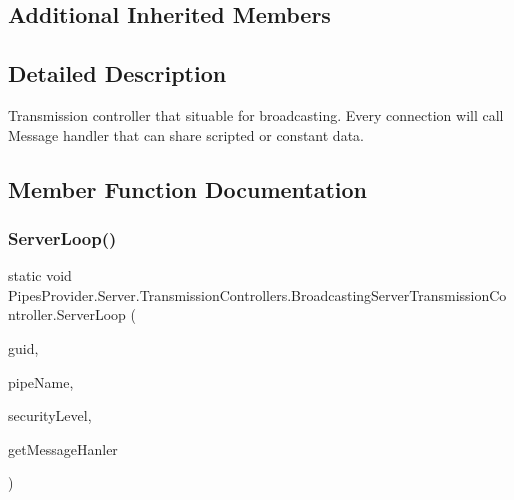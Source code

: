 \subsection*{Additional Inherited Members}


\subsection{Detailed Description}
Transmission controller that situable for broadcasting. Every connection will call Message handler that can share scripted or constant data. 



\subsection{Member Function Documentation}
\mbox{\label{class_pipes_provider_1_1_server_1_1_transmission_controllers_1_1_broadcasting_server_transmission_controller_aaa65501bc7934c782714b35247475c6d}} 
\subsubsection{\texorpdfstring{Server\+Loop()}{ServerLoop()}\hspace{0.1cm}{\footnotesize\ttfamily [1/2]}}
{\footnotesize\ttfamily static void Pipes\+Provider.\+Server.\+Transmission\+Controllers.\+Broadcasting\+Server\+Transmission\+Controller.\+Server\+Loop (\begin{DoxyParamCaption}\item[{out string}]{guid,  }\item[{string}]{pipe\+Name,  }\item[{\mbox{\hyperlink{namespace_pipes_provider_1_1_security_a1a6020eca1c661a6f7140e8260502d7e}{Security.\+Security\+Level}}}]{security\+Level,  }\item[{Broadcasting\+Server\+Transmission\+Controller.\+Message\+Handeler}]{get\+Message\+Hanler }\end{DoxyParamCaption})\hspace{0.3cm}{\ttfamily [static]}}



